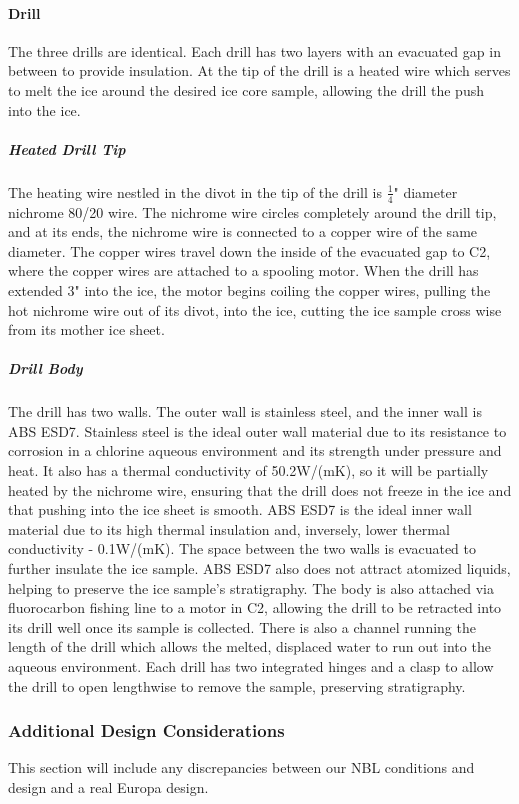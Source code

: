 \documentclass{article}
\begin{document}
\paragraph{Drill}
The three drills are identical. Each drill has two layers with an evacuated gap in between to provide insulation. At the tip of the drill is a heated wire which serves to melt the ice around the desired ice core sample, allowing the drill the push into the ice.
\subparagraph{Heated Drill Tip}
The heating wire nestled in the divot in the tip of the drill is $\frac{1}{4}$" diameter nichrome 80/20 wire. The nichrome wire circles completely around the drill tip, and at its ends, the nichrome wire is connected to a copper wire of the same diameter. The copper wires travel down the inside of the evacuated gap to C2, where the copper wires are attached to a spooling motor. When the drill has extended 3" into the ice, the motor begins coiling the copper wires, pulling the hot nichrome wire out of its divot, into the ice, cutting the ice sample cross wise from its mother ice sheet.
\subparagraph{Drill Body}
The drill has two walls. The outer wall is stainless steel, and the inner wall is ABS ESD7. Stainless steel is the ideal outer wall material due to its resistance to corrosion in a chlorine aqueous environment and its strength under pressure and heat. It also has a thermal conductivity of 50.2W/(mK), so it will be partially heated by the nichrome wire, ensuring that the drill does not freeze in the ice and that pushing into the ice sheet is smooth. ABS ESD7 is the ideal inner wall material due to its high thermal insulation and, inversely, lower thermal conductivity - 0.1W/(mK). The space between the two walls is evacuated to further insulate the ice sample. ABS ESD7 also does not attract atomized liquids, helping to preserve the ice sample’s stratigraphy. The body is also attached via fluorocarbon fishing line to a motor in C2, allowing the drill to be retracted into its drill well once its sample is collected. There is also a channel running the length of the drill which allows the melted, displaced water to run out into the aqueous environment. Each drill has two integrated hinges and a clasp to allow the drill to open lengthwise to remove the sample, preserving stratigraphy.
\subsubsection{Additional Design Considerations}
This section will include any discrepancies between our NBL conditions and design and a real Europa design.
\end{document}
